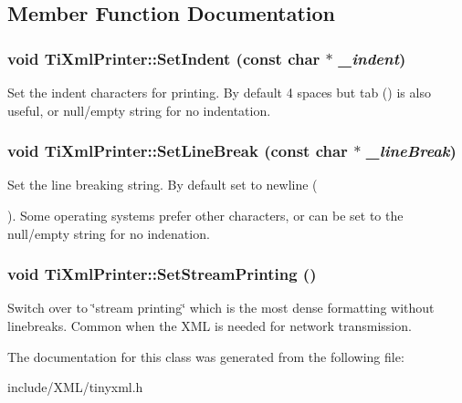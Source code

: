 \subsection{Member Function Documentation}
\hypertarget{class_ti_xml_printer_a213377a4070c7e625bae59716b089e5e}{
\subsubsection[{SetIndent}]{\setlength{\rightskip}{0pt plus 5cm}void TiXmlPrinter::SetIndent (const char $\ast$ {\em \_\-indent})}}
\label{class_ti_xml_printer_a213377a4070c7e625bae59716b089e5e}
Set the indent characters for printing. By default 4 spaces but tab () is also useful, or null/empty string for no indentation. \hypertarget{class_ti_xml_printer_a4be1e37e69e3858c59635aa947174fe6}{
\subsubsection[{SetLineBreak}]{\setlength{\rightskip}{0pt plus 5cm}void TiXmlPrinter::SetLineBreak (const char $\ast$ {\em \_\-lineBreak})}}
\label{class_ti_xml_printer_a4be1e37e69e3858c59635aa947174fe6}
Set the line breaking string. By default set to newline (\par
). Some operating systems prefer other characters, or can be set to the null/empty string for no indenation. \hypertarget{class_ti_xml_printer_ab23a90629e374cb1cadca090468bbd19}{
\subsubsection[{SetStreamPrinting}]{\setlength{\rightskip}{0pt plus 5cm}void TiXmlPrinter::SetStreamPrinting ()}}
\label{class_ti_xml_printer_ab23a90629e374cb1cadca090468bbd19}
Switch over to \char`\"{}stream printing\char`\"{} which is the most dense formatting without linebreaks. Common when the XML is needed for network transmission. 

The documentation for this class was generated from the following file:\begin{DoxyCompactItemize}
\item 
include/XML/tinyxml.h\end{DoxyCompactItemize}
